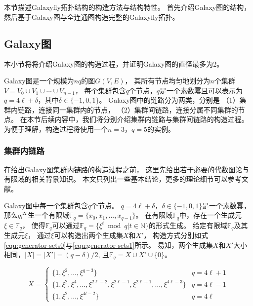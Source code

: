 本节描述Galaxyfly拓扑结构的构造方法与结构特性。
首先介绍Galaxy图的结构，然后基于Galaxy图与全连通图构造完整的Galaxyfly拓扑。

\subsection{Galaxy图}

本小节将将介绍Galaxy图的构造过程，并证明Galaxy图的直径最多为2。

Galaxy图是一个规模为$nq$的图$G(V,E)$，
其所有节点均匀地划分为$n$个集群$V= V_{0}\cup V_{1}\cup \cdots \cup V_{n-1}$，
每个集群包含$q$个节点，$q$是一个素数幂且可以表示为
$q=4\ell+\delta$，其中$\delta\in\{-1,0,1\}$。
Galaxy图中的链路分为两类，分别是
（1）集群内链路，连接同一集群内的节点，
（2）集群间链路，连接分属不同集群的节点。
在本节后续内容中，我们将分别介绍集群内链路与集群间链路的构造过程。
为便于理解，构造过程将使用一个$n=3$，$q=5$的实例。

\subsubsection{集群内链路}
在给出Galaxy图集群内链路的构造过程之前，
这里先给出若干必要的代数图论与有限域的相关背景知识。
本文只列出一些基本结论，更多的理论细节可以参考文献。

Galaxy图中每一个集群包含$q$个节点。
$q=4\ell+\delta$，$\delta\in\{-1,0,1\}$是一个素数幂，
那么$q$产生一个有限域$\mathds{F}_q=\{x_{0},x_{1},...,x_{q-1}\}$。
在有限域$\mathds{F}_q$中，存在一个生成元$\xi \in \mathds{F}_q$，
使得$\mathds{F}_q$可以通过$\mathds{F}_q = \{\xi^t \bmod q | t \in \mathds{N}\}$的形式生成。
给定有限域$\mathds{F}_q$及其生成元$\xi$，
通过$\xi$可以构造出两个生成集$X$和$X'$，
构造方式分别如式\eqref{equ:generator-sets0}与\eqref{equ:generator-sets1}所示。
易知，两个生成集$X$和$X'$大小相同，$|X|=|X'|=(q-\delta)/2$,
且$\mathds{F}_q = X \cup X' \cup \{0\}$。

\begin{equation}\label{equ:generator-sets0}
  X=
  \begin{cases}
    \{1,\xi^2,\ldots,\xi^{q-3}\}& q=4 \ell+1 \\
    \{1,\xi^2,\xi^4,\ldots, \xi^{2\ell-2},\xi^{2\ell-1},\xi^{2\ell+1},\ldots, \xi^{4\ell-3}\} & q=4 \ell-1 \\
    \{1,\xi^2,\ldots,\xi^{4l-2}\} & q=4 \ell
  \end{cases}
\end{equation}

